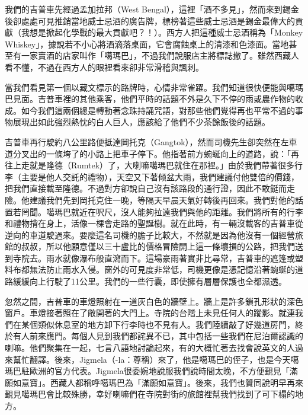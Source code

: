 我們的吉普車先經過孟加拉邦（West
Bengal），這裡「酒不多見」，然而來到錫金後卻處處可見推銷當地威士忌酒的廣告牌，標榜著這些威士忌酒是錫金最偉大的貢獻（我想是掀起化學戰的最大貢獻吧？！）。西方人把這種威士忌酒稱為「Monkey
Whiskey」，據說若不小心將酒滴落桌面，它會腐蝕桌上的清漆和色漆面。當地甚至有一家賣酒的店家叫作「噶瑪巴」，不過我們說服店主將標誌撤了。雖然西藏人看不懂，不過在西方人的眼裡看來卻非常滑稽與諷刺。

當我們看見第一個以藏文標示的路牌時，心情非常雀躍。我們知道很快便能與噶瑪巴見面。吉普車裡的其他乘客，他們平時的話題不外是久下不停的雨或農作物的收成。如今我們這兩個總是轉動著念珠持誦咒語，對那些他們覺得再也平常不過的事物展現出如此強烈熱忱的白人巨人，應該給了他們不少茶餘飯後的話題。

吉普車再行駛約八公里路便抵達岡托克（Gangtok），然而司機先生卻突然在左車道分叉出的一條垮了的小路上把車子停下。他指著前方蜿蜒向上的道路，說：「再往上走就是隆德（Rumtek）了，大喇嘛噶瑪巴就住在那裡。」由於我們帶著很多行李（主要是他人交託的禮物），天空又下著倾盆大雨，我們建議付他雙倍的價錢，把我們直接載至隆德。不過對方卻說自己沒有該路段的通行證，因此不敢鋌而走險。他建議我們先到岡托克住一晚，等隔天早晨天氣好轉後再回來。我們對他的話置若罔聞。噶瑪巴就近在呎尺，沒人能夠拉遠我們與他的距離。我們將所有的行李和禮物揹在身上，活像一棵會走路的聖誕樹。就在此時，有一輛沒載客的吉普車從逆向的車道駛過來。要麼這名司機的膽子比較大，不然就是因為他沒有一個經營旅館的叔叔，所以他願意僅以三十盧比的價格冒險開上這一條壞損的公路，把我們送到寺院去。雨水就像瀑布般直瀉而下。這場豪雨著實非比尋常，吉普車的遮篷或塑料布都無法防止雨水入侵。窗外的可見度非常低，司機更像是憑記憶沿著蜿蜒的道路緩緩向上行駛了11公里。我們的一些行囊，即使擁有層層保護也全都濕透。

忽然之間，吉普車的車燈照射在一道灰白色的牆壁上。牆上是許多鎖孔形狀的深色窗戶。車燈接著照在了敞開著的大門上。寺院的台階上未見任何人的蹤影。就連我們在某個類似休息室的地方卸下行李時也不見有人。我們陸續敲了好幾道房門，終於有人前來應門。每個人見到我們都詫異不已，其中包括一些我們在尼泊爾認識的喇嘛。他們聚集在一起，七言八語地討論起來，有的大概忙著去找會說英文的人過來幫忙翻譯。後來，Jigmela（-la：尊稱）來了，他是噶瑪巴的侄子，也是今天噶瑪巴駐歐洲的官方代表。Jigmela很委婉地說服我們說時間太晚，不方便覲見「滿願如意寶」。西藏人都稱呼噶瑪巴為「滿願如意寶」。後來，我們也贊同說明早再來覲見噶瑪巴會比較殊勝，幸好喇嘛們在寺院對街的旅館裡幫我們找到了可下榻的地方。

